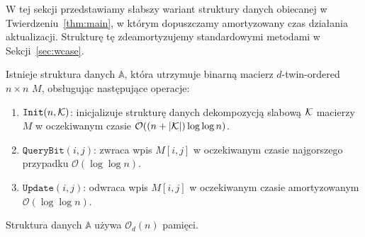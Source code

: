 \documentclass[runningheads]{llncs}
\newcommand{\Oh}{\mathcal{O}}
\begin{document}
W tej sekcji przedstawiamy słabszy wariant struktury danych obiecanej w Twierdzeniu~\ref{thm:main}, w którym dopuszczamy amortyzowany czas działania aktualizacji. Strukturę tę zdeamortyzujemy standardowymi metodami w Sekcji~\ref{sec:wcase}.


\begin{theorem}\label{thm:amortized}
Istnieje struktura danych $\mathbb{A}$, która utrzymuje
binarną macierz $d$-twin-ordered $n\times n$ $M$,
obsługując następujące operacje:
\begin{enumerate}
 \item $\mathtt{Init}(n, \cal K)$: inicjalizuje strukturę danych
 dekompozycją slabową $\cal K$ macierzy $M$ w
 oczekiwanym czasie $\Oh((n + |{\cal K}|) \log \log n)$.
 \item $\mathtt{QueryBit}(i,j)$: zwraca wpis $M[i, j]$ w
 oczekiwanym czasie najgorszego przypadku $\Oh(\log \log n)$.
 \item $\mathtt{Update}(i, j)$: odwraca wpis $M[i, j]$ w
 oczekiwanym czasie amortyzowanym $\Oh(\log \log n)$.
\end{enumerate}
Struktura danych $\mathbb{A}$ używa $\Oh_d(n)$ pamięci.
\end{theorem}
\end{document}
